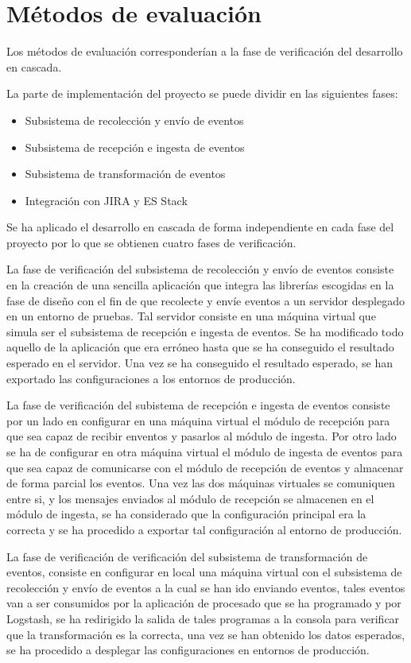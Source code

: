 \section{Métodos de evaluación}

Los métodos de evaluación corresponderían a la fase de verificación del desarrollo en cascada.

La parte de implementación del proyecto se puede dividir en las siguientes fases:

\begin{itemize}
	\item Subsistema de recolección y envío de eventos
	\item Subsistema de recepción e ingesta de eventos
	\item Subsistema de transformación de eventos
	\item Integración con JIRA y ES Stack
\end{itemize}

Se ha aplicado el desarrollo en cascada de forma independiente en cada fase del proyecto por lo que se obtienen cuatro fases de verificación.

La fase de verificación del subsistema de recolección y envío de eventos consiste en la creación de una sencilla aplicación que integra las librerías escogidas en la fase de diseño con el fin de que recolecte y envíe eventos a un servidor desplegado en un entorno de pruebas. Tal servidor consiste en una máquina virtual que simula ser el subsistema de recepción e ingesta de eventos. Se ha modificado todo aquello de la aplicación que era erróneo hasta que se ha conseguido el resultado esperado en el servidor. Una vez se ha conseguido el resultado esperado, se han exportado las configuraciones a los entornos de producción.

La fase de verificación del subistema de recepción e ingesta de eventos consiste por un lado en configurar en una máquina virtual el módulo de recepción para que sea capaz de recibir enventos y pasarlos al módulo de ingesta. Por otro lado se ha de configurar en otra máquina virtual el módulo de ingesta de eventos para que sea capaz de comunicarse con el módulo de recepción de eventos y almacenar de forma parcial los eventos. Una vez las dos máquinas virtuales se comuniquen entre si, y los mensajes enviados al módulo de recepción se almacenen en el módulo de ingesta, se ha considerado que la configuración principal era la correcta y se ha procedido a exportar tal configuración al entorno de producción.

La fase de verificación de verificación del subsistema de transformación de eventos, consiste en configurar en local una máquina virtual con el subsistema de recolección y envío de eventos a la cual se han ido enviando eventos, tales eventos van a ser consumidos por la aplicación de procesado que se ha programado y por Logstash, se ha redirigido la salida de tales programas a la consola para verificar que la transformación es la correcta, una vez se han obtenido los datos esperados, se ha procedido a desplegar las configuraciones en entornos de producción.

